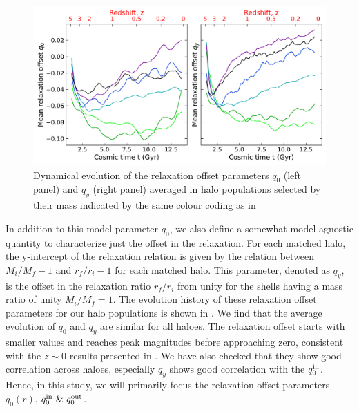 \begin{figure}[htbp]
\centering
\includegraphics[width=\linewidth]{plots/dynam_relxn/hal_relxn_offset_evolve.pdf}    \caption{Dynamical evolution of the relaxation offset parameters $q_0$ (left panel) and $q_y$ (right panel) averaged in halo populations selected by their mass indicated by the same colour coding as in }
\label{fig:evolution-hal-reln-offset}
\end{figure}
In addition to this model parameter $q_0$, we also define a somewhat model-agnostic quantity to characterize just the offset in the relaxation.  For each matched halo, the y-intercept of the relaxation relation is given by the relation between $M_i/M_f-1$ and $r_f/r_i-1$ for each matched halo. This parameter, denoted as $q_y$, is the offset in the relaxation ratio $r_f/r_i$ from unity for the shells having a mass ratio of unity $M_i/M_f=1$. The evolution history of these relaxation offset parameters for our halo populations is shown in . We find that the average evolution of $q_0$ and $q_y$ are similar for all haloes.  The relaxation offset starts with smaller values and reaches peak magnitudes before approaching zero, consistent with the $z \sim 0$ results presented in .  We have also checked that they show good correlation across haloes, especially $q_y$ shows good correlation with the $q_0^{\rm{in}}$. Hence, in this study, we will primarily focus the relaxation offset parameters $q_0(r)$,  $q_0^{\rm{in}} ~\& ~q_0^{\rm{out}}$.





